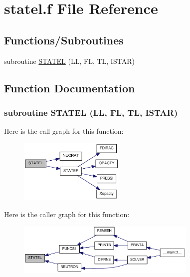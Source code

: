 \hypertarget{statel_8f}{
\section{statel.f File Reference}
\label{statel_8f}
}
\subsection*{Functions/Subroutines}
\begin{DoxyCompactItemize}
\item 
subroutine \hyperlink{statel_8f_a77da1cfaae78dd64f83361c6d1f2d56f}{STATEL} (LL, FL, TL, ISTAR)
\end{DoxyCompactItemize}


\subsection{Function Documentation}
\hypertarget{statel_8f_a77da1cfaae78dd64f83361c6d1f2d56f}{
\subsubsection[{STATEL}]{\setlength{\rightskip}{0pt plus 5cm}subroutine STATEL (LL, \/  FL, \/  TL, \/  ISTAR)}}
\label{statel_8f_a77da1cfaae78dd64f83361c6d1f2d56f}


Here is the call graph for this function:\nopagebreak
\begin{figure}[H]
\begin{center}
\leavevmode
\includegraphics[width=143pt]{statel_8f_a77da1cfaae78dd64f83361c6d1f2d56f_cgraph}
\end{center}
\end{figure}


Here is the caller graph for this function:\nopagebreak
\begin{figure}[H]
\begin{center}
\leavevmode
\includegraphics[width=244pt]{statel_8f_a77da1cfaae78dd64f83361c6d1f2d56f_icgraph}
\end{center}
\end{figure}
